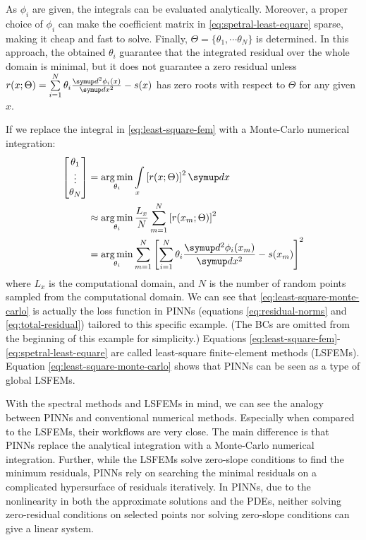 As $\phi_i$ are given, the integrals can be evaluated analytically.
Moreover, a proper choice of $\phi_i$ can make the coefficient matrix in \eqref{eq:spetral-least-equare} sparse, making it cheap and fast to solve.
Finally, $\Theta=\{\theta_1,\cdots\theta_N\}$ is determined.
In this approach, the obtained $\theta_i$ guarantee that the integrated residual over the whole domain is minimal, but it does not guarantee a zero residual unless $r(x; \Theta) = \sum\limits_{i=1}^{N}\theta_i \frac{\diff^2 \phi_i(x)}{\diff x^2} - s(x)$ has zero roots with respect to $\Theta$ for any given $x$.

If we replace the integral in \eqref{eq:least-square-fem} with a Monte-Carlo numerical integration:
\begin{equation}\label{eq:least-square-monte-carlo}
    \begin{aligned}
        \begin{bmatrix}
            \theta_1 \\ \vdots \\ \theta_N
        \end{bmatrix}
        & =
        \operatorname*{arg\,min}\limits_{\theta_i}
        \int\limits_{x}\left[r(x; \Theta)\right]^2\diff x \\
        &\approx
        \operatorname*{arg\,min}\limits_{\theta_i}
        \frac{L_x}{N}\sum\limits_{m=1}^{N}\left[r(x_m; \Theta)\right]^2 \\
        & =
        \operatorname*{arg\,min}\limits_{\theta_i}
        \sum\limits_{m=1}^{N}\left[\sum\limits_{i=1}^{N}\theta_i \frac{\diff^2 \phi_i(x_m)}{\diff x^2} - s(x_m)\right]^2
    \end{aligned}
\end{equation}
where $L_x$ is the computational domain, and $N$ is the number of random points sampled from the computational domain.
We can see that \eqref{eq:least-square-monte-carlo} is actually the loss function in PINNs (equations \eqref{eq:residual-norms} and \eqref{eq:total-residual}) tailored to this specific example.
(The BCs are omitted from the beginning of this example for simplicity.)
Equations \eqref{eq:least-square-fem}-\eqref{eq:spetral-least-equare} are called least-square finite-element methods (LSFEMs).
Equation \eqref{eq:least-square-monte-carlo} shows that PINNs can be seen as a type of global LSFEMs.

With the spectral methods and LSFEMs in mind, we can see the analogy between PINNs and conventional numerical methods.
Especially when compared to the LSFEMs, their workflows are very close.
The main difference is that PINNs replace the analytical integration with a Monte-Carlo numerical integration.
Further, while the LSFEMs solve zero-slope conditions to find the minimum residuals, PINNs rely on searching the minimal residuals on a complicated hypersurface of residuals iteratively.
In PINNs, due to the nonlinearity in both the approximate solutions and the PDEs, neither solving zero-residual conditions on selected points nor solving zero-slope conditions can give a linear system. 

